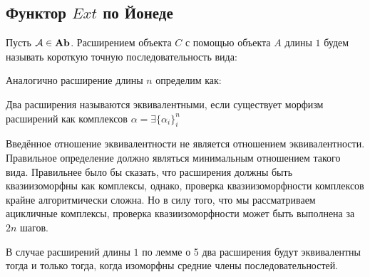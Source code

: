 \documentclass[../hw_main.tex]{subfiles}
\begin{document}
\subsection{Функтор $Ext$ по Йонеде}
\begin{to_def}
Пусть $\mathcal{A} \in \mathbf{Ab}$. Расширением объекта $C$ с помощью объекта $A$ длины $1$ будем называть короткую точную последовательность вида:
\bee
{}
\eee
Аналогично расширение длины $n$ определим как:
\bee
{}
\eee
\end{to_def}
\begin{to_def}
Два расширения называются эквивалентными, если существует морфизм расширений как комплексов $\alpha = \exists\{\alpha_i\}_i^{n}$
\bee
{}
\eee
\end{to_def}
\begin{to_com}
Введённое отношение эквивалентности не является отношением эквивалентности. Правильное определение должно являться минимальным отношением такого вида. Правильнее было бы сказать, что расширения должны быть квазиизоморфны как комплексы, однако, проверка квазиизоморфности комплексов крайне алгоритмически сложна. Но в силу того, что мы рассматриваем ацикличные комплексы, проверка квазиизоморфности может быть выполнена за $2n$ шагов.
\end{to_com}
В случае расширений длины $1$ по лемме о 5 два расширения будут эквивалентны тогда и только тогда, когда изоморфны средние члены последовательностей. 
\bee
{}
\eee
\end{document}
